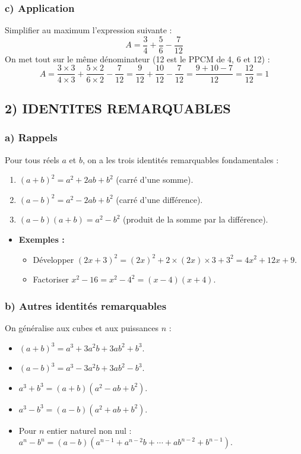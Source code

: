 \documentclass[12pt,a4paper]{article}
\begin{document}
\subsubsection*{\color{myred} c) Application}
Simplifier au maximum l'expression suivante :
\[
A = \frac{3}{4} + \frac{5}{6} - \frac{7}{12}
\]
On met tout sur le même dénominateur (12 est le PPCM de 4, 6 et 12) :
\[
A = \frac{3 \times 3}{4 \times 3} + \frac{5 \times 2}{6 \times 2} - \frac{7}{12}
= \frac{9}{12} + \frac{10}{12} - \frac{7}{12}
= \frac{9+10-7}{12} = \frac{12}{12} = 1
\]

\subsection*{\color{myred} 2) IDENTITES REMARQUABLES}

\subsubsection*{\color{myred} a) Rappels}
Pour tous réels $a$ et $b$, on a les trois identités remarquables fondamentales :
\begin{enumerate}
    \item $(a+b)^2 = a^2 + 2ab + b^2$ (carré d'une somme).
    \item $(a-b)^2 = a^2 - 2ab + b^2$ (carré d'une différence).
    \item $(a-b)(a+b) = a^2 - b^2$ (produit de la somme par la différence).
\end{enumerate}

\begin{itemize}
    \item \textbf{Exemples :}
    \begin{itemize}
        \item Développer $(2x+3)^2 = (2x)^2 + 2 \times (2x) \times 3 + 3^2 = 4x^2 + 12x + 9$.
        \item Factoriser $x^2 - 16 = x^2 - 4^2 = (x-4)(x+4)$.
    \end{itemize}
\end{itemize}

\subsubsection*{\color{myred} b) Autres identités remarquables}
On généralise aux cubes et aux puissances $n$ :
\begin{itemize}
    \item $(a+b)^3 = a^3 + 3a^2b + 3ab^2 + b^3$.
    \item $(a-b)^3 = a^3 - 3a^2b + 3ab^2 - b^3$.
    \item $a^3 + b^3 = (a+b)(a^2 - ab + b^2)$.
    \item $a^3 - b^3 = (a-b)(a^2 + ab + b^2)$.
    \item Pour $n$ entier naturel non nul : $a^n - b^n = (a-b)(a^{n-1} + a^{n-2}b + \cdots + ab^{n-2} + b^{n-1})$.
\end{itemize}
\end{document}
